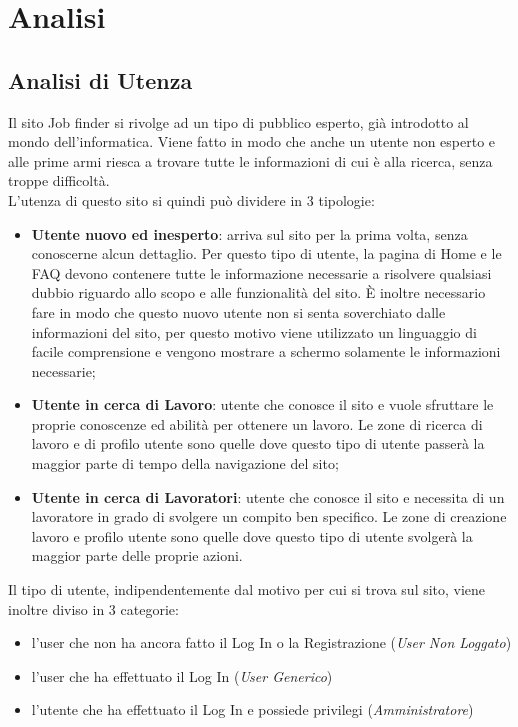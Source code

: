 \section{Analisi}
	
  \subsection{Analisi di Utenza}	
	  Il sito Job finder si rivolge ad un tipo di pubblico esperto, già introdotto al mondo dell’informatica. Viene fatto in modo che anche un utente non esperto e alle prime 
    armi riesca a trovare tutte le informazioni di cui è alla ricerca, senza troppe difficoltà.\\	
    L’utenza di questo sito si quindi può dividere in 3 tipologie:
	  \begin{itemize}
      \item \textbf{Utente nuovo ed inesperto}: arriva sul sito per la prima volta, senza conoscerne alcun dettaglio. Per questo tipo di utente, la pagina di Home e le FAQ devono contenere tutte 
      le informazione necessarie a risolvere qualsiasi dubbio riguardo allo scopo e alle funzionalità del sito. È inoltre necessario fare in modo che questo nuovo utente non si
      senta soverchiato dalle informazioni del sito, per questo motivo viene utilizzato un linguaggio di facile comprensione e vengono mostrare a schermo solamente le 
      informazioni necessarie;
      \item \textbf{Utente in cerca di Lavoro}: utente che conosce il sito e vuole sfruttare le proprie conoscenze ed abilità per ottenere un lavoro. Le zone di ricerca di lavoro e di profilo utente 
      sono quelle dove questo tipo di utente passerà la maggior parte di tempo della navigazione del sito;
      \item \textbf{Utente in cerca di Lavoratori}: utente che conosce il sito e necessita di un lavoratore in grado di svolgere un compito ben specifico. Le zone di creazione lavoro 
      e profilo utente sono quelle dove questo tipo di utente svolgerà la maggior parte delle proprie azioni.
    \end{itemize}
    Il tipo di utente, indipendentemente dal motivo per cui si trova sul sito, viene inoltre diviso in 3 categorie:
    \begin{itemize} 
      \item l’user che non ha ancora fatto il Log In o la Registrazione (\textit{User Non Loggato})
      \item l’user che ha effettuato il Log In (\textit{User Generico}) 
      \item l’utente che ha effettuato il Log In e possiede privilegi (\textit{Amministratore})
    \end{itemize}


